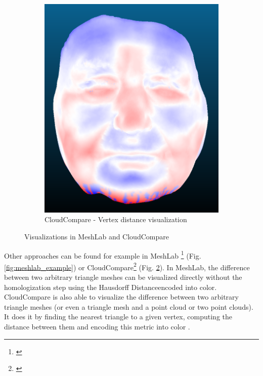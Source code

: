 \begin{figure}[h]
\begin{subfigure}{0.3\textwidth}
	\includegraphics[width=\textwidth]{./img/cloudcompare-example01.PNG}
    \caption[CloudCompare - Vertex distance visualization]{CloudCompare - Vertex distance visualization}
    \label{fig:cloudcompare_example}
	\end{subfigure}
\caption{Visualizations in MeshLab and CloudCompare}
\end{figure}

Other approaches can be found for example in MeshLab \footnote{\citet{MeshLab}} (Fig. \ref{fig:meshlab_example}) or CloudCompare\footnote{\citet{CloudCmp}} (Fig. \ref{fig:cloudcompare_example}). In MeshLab, the difference between two arbitrary triangle meshes can be visualized directly without the homologization step using the Hausdorff Distance\footnotemark encoded into color. CloudCompare is also able to visualize the difference between two arbitrary triangle meshes (or even a triangle mesh and a point cloud or two point clouds). It does it by finding the nearest triangle to a given vertex, computing the distance between them and encoding this metric into color \citep{CloudCmpDistance}.


